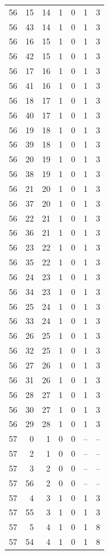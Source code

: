 \begin{longtable}{rrrrrrr}
56 & 15 & 14 & 1 & 0 & 1 & 3\\
56 & 43 & 14 & 1 & 0 & 1 & 3\\
56 & 16 & 15 & 1 & 0 & 1 & 3\\
56 & 42 & 15 & 1 & 0 & 1 & 3\\
56 & 17 & 16 & 1 & 0 & 1 & 3\\
56 & 41 & 16 & 1 & 0 & 1 & 3\\
56 & 18 & 17 & 1 & 0 & 1 & 3\\
56 & 40 & 17 & 1 & 0 & 1 & 3\\
56 & 19 & 18 & 1 & 0 & 1 & 3\\
56 & 39 & 18 & 1 & 0 & 1 & 3\\
56 & 20 & 19 & 1 & 0 & 1 & 3\\
56 & 38 & 19 & 1 & 0 & 1 & 3\\
56 & 21 & 20 & 1 & 0 & 1 & 3\\
56 & 37 & 20 & 1 & 0 & 1 & 3\\
56 & 22 & 21 & 1 & 0 & 1 & 3\\
56 & 36 & 21 & 1 & 0 & 1 & 3\\
56 & 23 & 22 & 1 & 0 & 1 & 3\\
56 & 35 & 22 & 1 & 0 & 1 & 3\\
56 & 24 & 23 & 1 & 0 & 1 & 3\\
56 & 34 & 23 & 1 & 0 & 1 & 3\\
56 & 25 & 24 & 1 & 0 & 1 & 3\\
56 & 33 & 24 & 1 & 0 & 1 & 3\\
56 & 26 & 25 & 1 & 0 & 1 & 3\\
56 & 32 & 25 & 1 & 0 & 1 & 3\\
56 & 27 & 26 & 1 & 0 & 1 & 3\\
56 & 31 & 26 & 1 & 0 & 1 & 3\\
56 & 28 & 27 & 1 & 0 & 1 & 3\\
56 & 30 & 27 & 1 & 0 & 1 & 3\\
56 & 29 & 28 & 1 & 0 & 1 & 3\\
57 & 0 & 1 & 0 & 0 & -- & --\\
57 & 2 & 1 & 0 & 0 & -- & --\\
57 & 3 & 2 & 0 & 0 & -- & --\\
57 & 56 & 2 & 0 & 0 & -- & --\\
57 & 4 & 3 & 1 & 0 & 1 & 3\\
57 & 55 & 3 & 1 & 0 & 1 & 3\\
57 & 5 & 4 & 1 & 0 & 1 & 8\\
57 & 54 & 4 & 1 & 0 & 1 & 8\\

\end{longtable}
